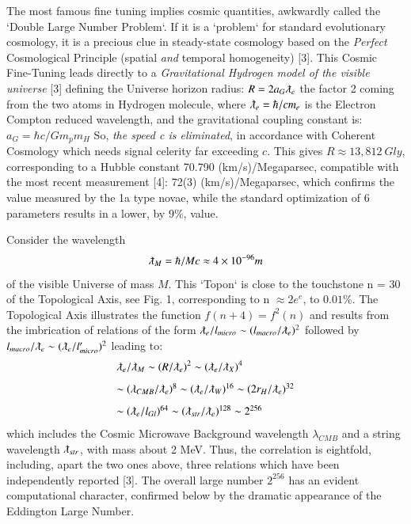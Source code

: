 \documentclass[twoside,draft]{article}
\begin{document}
\begin{sloppypar}
{The most famous fine tuning implies cosmic quantities, awkwardly called the `Double
Large Number Problem`. If it is a `problem` for standard evolutionary cosmology, it is a precious
clue in steady-state cosmology based on the \textit{Perfect} Cosmological Principle (spatial \textit{and} temporal homogeneity) [3].
This Cosmic Fine-Tuning leads directly to a \textit{Gravitational Hydrogen model of the visible universe} [3]
defining the Universe horizon radius: $R = 2a_{G} \lambdabar_{e}$ the factor 2 coming from the two atoms in
Hydrogen molecule, where 
$\lambdabar_{e} = \hbar/cm_{e}$
is the Electron Compton reduced wavelength, and the
gravitational coupling constant is: 
$a_{G} = \hbar c/Gm_{p}m_{H}$
So, \textit{the speed c is eliminated}, in accordance with
Coherent Cosmology which needs signal celerity far exceeding $c$. This gives $R \approx 13,812~Gly $, corresponding to a Hubble constant 70.790 (km/s)/Megaparsec, compatible with the
most recent measurement [4]: 72(3) (km/s)/Megaparsec, which confirms the value measured by the 1a type novae, while the standard optimization of 6 parameters results in a lower, by $9\%$, value.

Consider the wavelength $$\lambdabar_{M} = \hbar /Mc \approx 4 \times 10^{-96} m$$ of the visible Universe of mass $M$. This `Topon` is close to the touchstone n = 30 of the Topological Axis, see Fig. 1,
corresponding to n $\approx 2e^{e}$, to $0.01\%$. The Topological Axis illustrates the function $f(n + 4) = f^{2}(n)$
and results from the imbrication of relations of the form 
$
\lambdabar_{e} /l_{micro} \sim (l_{macro} /\lambdabar_{e})^{2}
$
followed by 
$
l_{macro} /\lambdabar_{e} \sim (\lambdabar_{e} /l^{\prime}_{micro} )^{2}
$ leading to:
$$
\begin{array}{ll}
%
\displaystyle
\lambdabar_{e}/\lambdabar_{M} \sim (R/\lambdabar_{e})^{2} \sim (\lambdabar_{e}/ \lambdabar_{X})^{4}\\[+8pt]  %
\sim (\lambda_{CMB}/ \lambdabar_{e})^{8} \sim (\lambdabar_{e}/\lambdabar_{W})^{16} \sim (2r_{H} /\lambdabar_{e})^{32}\\[+8pt] %
\sim (\lambdabar_{e}/ l_{Gl} )^{64} \sim (\lambdabar_{str} /\lambdabar_{e} )^{128} \sim 2^{256}\\ %
\end{array}
$$
which includes the Cosmic Microwave Background wavelength $\lambda_{CMB}$ and a string wavelength $\lambdabar_{str}$, with mass about 2 MeV. Thus, the correlation is eightfold,
including, apart the two ones above, three relations which have been independently reported [3].
The overall large number $2^{256}$ has an evident computational character, confirmed below by the
dramatic appearance of the Eddington Large Number.

}
\end{sloppypar}
\end{document}
